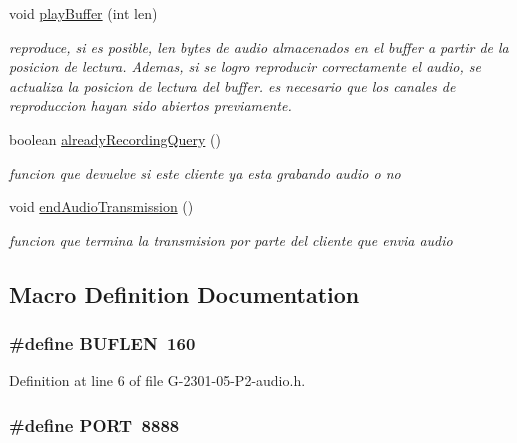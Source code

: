 \begin{DoxyCompactItemize}
void \hyperlink{_g-2301-05-_p2-audio_8h_a46e32d8c31f4e0bed7c4a3dd7665ba73}{play\-Buffer} (int len)
\begin{DoxyCompactList}\small\item\em reproduce, si es posible, len bytes de audio almacenados en el buffer a partir de la posicion de lectura. Ademas, si se logro reproducir correctamente el audio, se actualiza la posicion de lectura del buffer. es necesario que los canales de reproduccion hayan sido abiertos previamente. \end{DoxyCompactList}\item 
boolean \hyperlink{_g-2301-05-_p2-audio_8h_a23e6ef186ace7452878618e453a12d6f}{already\-Recording\-Query} ()
\begin{DoxyCompactList}\small\item\em funcion que devuelve si este cliente ya esta grabando audio o no \end{DoxyCompactList}\item 
void \hyperlink{_g-2301-05-_p2-audio_8h_a2140fd94315d561f0df0972d18f144cc}{end\-Audio\-Transmission} ()
\begin{DoxyCompactList}\small\item\em funcion que termina la transmision por parte del cliente que envia audio \end{DoxyCompactList}\end{DoxyCompactItemize}


\subsection{Macro Definition Documentation}
\hypertarget{_g-2301-05-_p2-audio_8h_ad974fe981249f5e84fbf1683b012c9f8}{
\subsubsection[{B\-U\-F\-L\-E\-N}]{\setlength{\rightskip}{0pt plus 5cm}\#define B\-U\-F\-L\-E\-N~160}}\label{_g-2301-05-_p2-audio_8h_ad974fe981249f5e84fbf1683b012c9f8}


Definition at line 6 of file G-\/2301-\/05-\/\-P2-\/audio.\-h.

\hypertarget{_g-2301-05-_p2-audio_8h_a614217d263be1fb1a5f76e2ff7be19a2}{
\subsubsection[{P\-O\-R\-T}]{\setlength{\rightskip}{0pt plus 5cm}\#define P\-O\-R\-T~8888}}\label{_g-2301-05-_p2-audio_8h_a614217d263be1fb1a5f76e2ff7be19a2}


